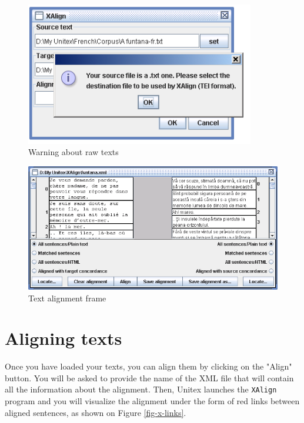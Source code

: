 \begin{figure}[!ht]
\begin{center}
\includegraphics[width=10cm]{resources/img/figX-2.png}
\caption{Warning about raw texts\label{fig-x-tei-name}}
\end{center}
\end{figure}
\clearpage


\begin{figure}[!ht]
\begin{center}
\includegraphics[width=15.5cm]{resources/img/figX-3.png}
\caption{Text alignment frame\label{fig-x-frame}}
\end{center}
\end{figure}

\section{Aligning texts}
Once you have loaded your texts, you can align them by clicking on the "Align"
button. You will be asked to provide the name of the XML file that will
contain all the information about the alignment. Then, Unitex launches the
\verb+XAlign+ program and you will visualize the alignment under the form of
red links between aligned sentences, as shown on Figure \ref{fig-x-links}.

